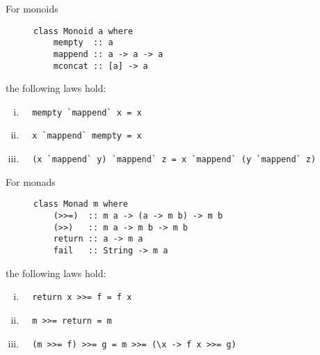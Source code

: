 \documentclass[a4paper,11pt]{article}
\begin{document}
\begin{outline}
    For monoids
    \begin{figure}[thp]
      \centering 
      \begin{minipage}{0.4\textwidth}
        \begin{verbatim}
class Monoid a where
    mempty  :: a
    mappend :: a -> a -> a
    mconcat :: [a] -> a
        \end{verbatim}
      \end{minipage}
    \end{figure}
    
    the following laws hold:
    \begin{enumerate}[i.]
      \item
        \begin{verbatim}
  mempty `mappend` x = x
        \end{verbatim}
      \item
        \begin{verbatim}
  x `mappend` mempty = x
        \end{verbatim}
      \item
        \begin{verbatim}
  (x `mappend` y) `mappend` z = x `mappend` (y `mappend` z)
        \end{verbatim}
    \end{enumerate}
    
  \pagebreak
    For monads
    \begin{figure}[thp]
      \centering 
      \begin{minipage}{0.4\textwidth}
        \begin{verbatim}
class Monad m where
    (>>=)  :: m a -> (a -> m b) -> m b
    (>>)   :: m a -> m b -> m b
    return :: a -> m a
    fail   :: String -> m a
        \end{verbatim}
      \end{minipage}
    \end{figure}
    
    the following laws hold:
    \begin{enumerate}[i.]
      \item
        \begin{verbatim}
  return x >>= f = f x
        \end{verbatim}
      \item
        \begin{verbatim}
  m >>= return = m
        \end{verbatim}
      \item
        \begin{verbatim}
  (m >>= f) >>= g = m >>= (\x -> f x >>= g)
        \end{verbatim}
    \end{enumerate}
    
\end{outline}
\end{document}
